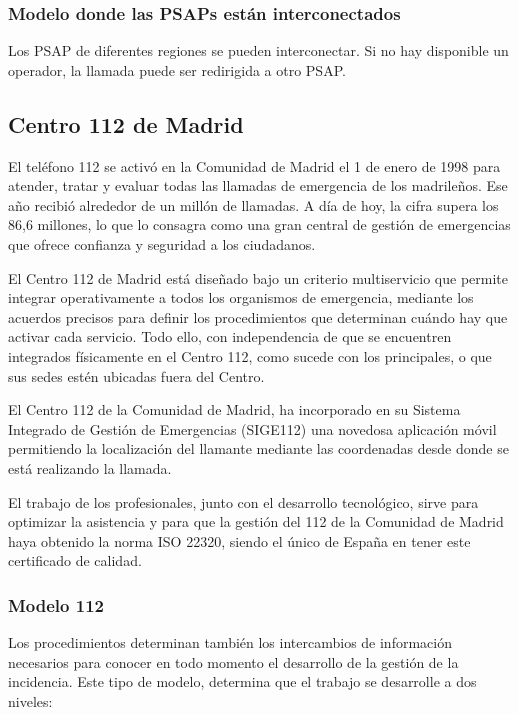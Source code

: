 \subsubsection{Modelo donde las PSAPs están interconectados}

Los PSAP de diferentes regiones se pueden interconectar. Si no hay disponible un operador, la llamada puede ser redirigida a otro PSAP.

\subsection{Centro 112 de Madrid}

El teléfono 112 se activó en la Comunidad de Madrid el 1 de enero de 1998 para atender, tratar y evaluar todas las llamadas de emergencia de los madrileños. Ese año recibió alrededor de un millón de llamadas. A día de hoy, la cifra supera los 86,6 millones, lo que lo consagra como una gran central de gestión de emergencias que ofrece confianza y seguridad a los ciudadanos.

El Centro 112 de Madrid está diseñado bajo un criterio multiservicio que permite integrar operativamente a todos los organismos de emergencia, mediante los acuerdos precisos para definir los procedimientos que determinan cuándo hay que activar cada servicio. Todo ello, con independencia de que se encuentren integrados físicamente en el Centro 112, como sucede con los principales, o que sus sedes estén ubicadas fuera del Centro.

El Centro 112 de la Comunidad de Madrid, ha incorporado en su Sistema Integrado de Gestión de Emergencias (SIGE112) una novedosa aplicación móvil permitiendo la localización del llamante mediante las coordenadas desde donde se está realizando la llamada.

El trabajo de los profesionales, junto con el desarrollo tecnológico, sirve para optimizar la asistencia y para que la gestión del 112 de la Comunidad de Madrid haya obtenido la norma ISO 22320, siendo el único de España en tener este certificado de calidad.

\subsubsection{Modelo 112}

Los procedimientos determinan también los intercambios de información necesarios para conocer en todo momento el desarrollo de la gestión de la incidencia. Este tipo de modelo, determina que el trabajo se desarrolle a dos niveles:

